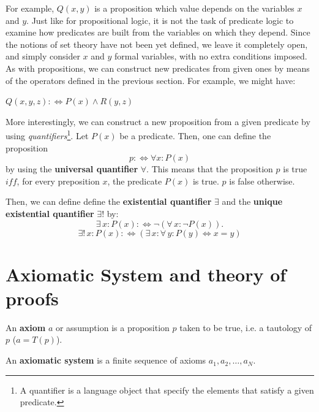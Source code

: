 \documentclass[root.tex]{subfiles}
\begin{document}
For example, $Q(x,y)$ is a proposition which value depends on the variables $x$ and $y$. Just like for propositional logic, it is not the task of predicate logic to examine how predicates are built from the variables on which they depend. Since the notions of set theory have not been yet defined, we leave it completely open, and simply consider $x$ and $y$ formal variables, with no extra conditions imposed. As with propositions, we can construct new predicates from given ones by means of the operators defined in the previous section. For example, we might have:
\begin{myex}
  $Q(x,y,z):\Leftrightarrow P(x) \land R(y,z)$
\end{myex}

More interestingly, we can construct a new proposition from a given predicate by using \emph{quantifiers}\footnote{A quantifier is a language object that specify the elements that satisfy a given predicate.}.
Let $P(x)$ be a predicate. Then, one can define the proposition
$$p:\Leftrightarrow \forall x : P(x)$$
by using the \textbf{universal quantifier} $\forall$. This means that the proposition $p$ is true $iff$, for every preposition $x$, the predicate $P(x)$ is true. $p$ is false otherwise.

Then, we can define define the \textbf{existential quantifier} $\exists$  and the \textbf{unique existential quantifier} $\exists !$ by: 
$$
\exists \, x : P(x) : \Leftrightarrow \neg (\forall \, x : \neg P(x)).
$$
$$
\exists ! \, x : P(x) :\Leftrightarrow (\exists \, x : \forall \, y : P(y) \Leftrightarrow x=y)
$$

\section{Axiomatic System and theory of proofs}%

\begin{mydef}
  An \textbf{axiom} $a$ or assumption is a proposition $p$ taken to be true, i.e. a tautology of $p$ ($a=T(p)$).
\end{mydef}

\begin{mydef}
  An \textbf{axiomatic system} is a finite sequence of axioms $a_1,a_2,\ldots,a_N$.
\end{mydef}
\end{document}
